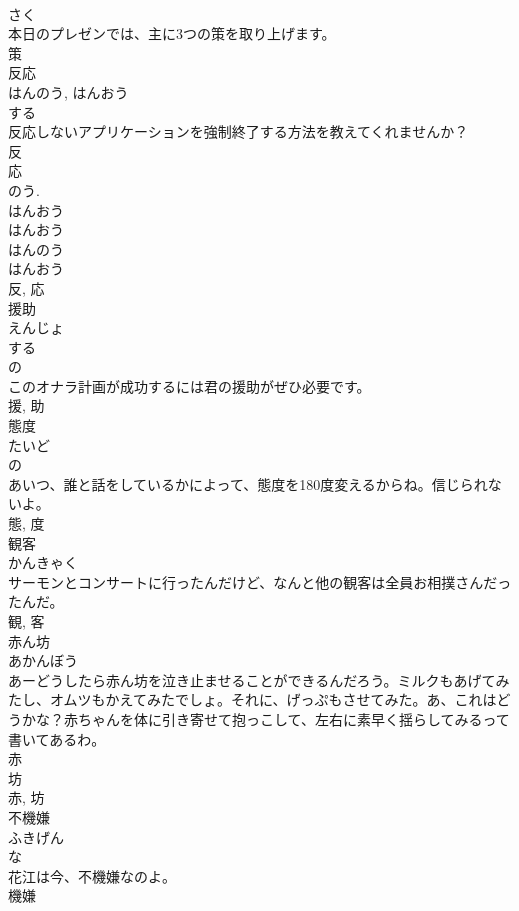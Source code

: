 \documentclass[8pt]{extreport}
\begin{document}
\begin{CJK}{UTF8}{min}
\\	さく	
\\	本日のプレゼンでは、主に3つの策を取り上げます。	
\\	策	
\\	反応	
\\	はんのう, はんおう	
\\	する 
\\	反応しないアプリケーションを強制終了する方法を教えてくれませんか？	
\\	反 
\\	応 
\\	のう. 
\\	はんおう 
\\	はんおう 
\\	はんのう 
\\	はんおう 
\\	反, 応	
\\	援助	
\\	えんじょ	
\\	する 
\\	の 
\\	このオナラ計画が成功するには君の援助がぜひ必要です。	
\\	援, 助	
\\	態度	
\\	たいど	
\\	の 
\\	あいつ、誰と話をしているかによって、態度を180度変えるからね。信じられないよ。	
\\	態, 度	
\\	観客	
\\	かんきゃく	
\\	サーモンとコンサートに行ったんだけど、なんと他の観客は全員お相撲さんだったんだ。	
\\	観, 客	
\\	赤ん坊	
\\	あかんぼう	
\\	あーどうしたら赤ん坊を泣き止ませることができるんだろう。ミルクもあげてみたし、オムツもかえてみたでしょ。それに、げっぷもさせてみた。あ、これはどうかな？赤ちゃんを体に引き寄せて抱っこして、左右に素早く揺らしてみるって書いてあるわ。	
\\	赤 
\\	坊 
\\	赤, 坊	
\\	不機嫌	
\\	ふきげん	
\\	な 
\\	花江は今、不機嫌なのよ。	
\\	機嫌 

\end{CJK}
\end{document}
